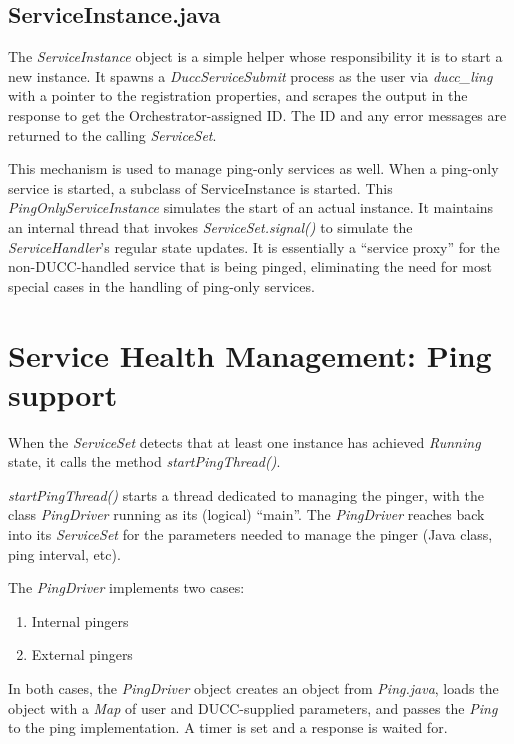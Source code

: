 \subsection{ServiceInstance.java}
    The {\em ServiceInstance} object is a simple helper whose responsibility it is to start
    a new instance.  It spawns a {\em DuccServiceSubmit} process as the user via {\em ducc\_ling} with a pointer to the
    registration properties, and scrapes the output in the response to get the Orchestrator-assigned
    ID.  The ID and any error messages are returned to the calling {\em ServiceSet}.

    This mechanism is used to manage ping-only services as well.  When a ping-only service is started,
    a subclass of ServiceInstance is started.  This {\em PingOnlyServiceInstance} simulates the start
    of an actual instance.  It maintains an internal thread that invokes {\em ServiceSet.signal()} to simulate
    the {\em ServiceHandler}'s regular state updates.  It is essentially a ``service proxy'' for the 
    non-DUCC-handled service that is being pinged, eliminating the need for most special cases in the
    handling of ping-only services.

\section{Service Health Management: Ping support}
    When the {\em ServiceSet} detects that at least one instance has achieved {\em Running} state,
    it calls the method {\em startPingThread()}.

    {\em startPingThread()} starts a thread dedicated to managing the pinger, with the class
    {\em PingDriver} running as its (logical) ``main''.  The {\em PingDriver} reaches back into its
    {\em ServiceSet} for the parameters needed to manage the pinger (Java class, ping interval,
    etc).

    The {\em PingDriver} implements two cases:
    \begin{enumerate}
      \item Internal pingers
      \item External pingers
    \end{enumerate}
    
    In both cases, the {\em PingDriver} object creates an object from {\em Ping.java}, loads
    the object with a {\em Map} of user and DUCC-supplied parameters, and passes the {\em Ping} to
    the ping implementation.  A timer is set and a response is waited for.  

